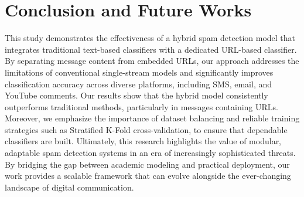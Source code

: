 \documentclass{article}
\begin{document}


\section{Conclusion and Future Works}
This study demonstrates the effectiveness of a hybrid spam detection model that integrates traditional text-based classifiers with a dedicated URL-based classifier. By separating message content from embedded URLs, our approach addresses the limitations of conventional single-stream models and significantly improves classification accuracy across diverse platforms, including SMS, email, and YouTube comments. Our results show that the hybrid model consistently outperforms traditional methods, particularly in messages containing URLs. Moreover, we emphasize the importance of dataset balancing and reliable training strategies such as Stratified K-Fold cross-validation, to ensure that dependable classifiers are built. Ultimately, this research highlights the value of modular, adaptable spam detection systems in an era of increasingly sophisticated threats. By bridging the gap between academic modeling and practical deployment, our work provides a scalable framework that can evolve alongside the ever-changing landscape of digital communication.
\newline
\end{document}
